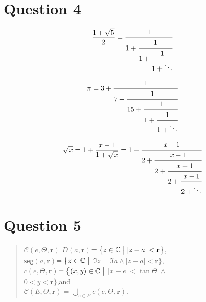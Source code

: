 \documentclass[a4paper,12pt]{article}
\begin{document}
\section{Question 4}

\[
  \frac{1+\sqrt{5}}{2}=
   \cfrac{1}{1+
	\cfrac{1}{1+
     \cfrac{1}{1+\ddots
}}}
\]

\[
  \pi=3+
   \cfrac{1}{7+
	\cfrac{1}{15+
	 \cfrac{1}{1+
	  \cfrac{1}{1+\ddots
}}}}
\]

\[
  \sqrt{x} =1 + \frac{x-1}{1+\sqrt{x}}=1+
   \cfrac{x-1}{2+
	\cfrac{x-1}{2+
	 \cfrac{x-1}{2+
	  \cfrac{x-1}{2+\ddots
}}}}
\]

\section{Question 5}

\begin{quote}
  \begin{tabbing}
	$\mathcal{C}(e,\Theta,\mathbf{r})$\quad\=\kill
	  $D(a,\mathbf{r})$\>$=\bigl\{ z\in \mathbb{C}\bigm| |z-a| 
	  < \mathbf{r}\big\}$,\\
	  $\mathsf{seg} (a,\textbf{r})$\>$=\bigl\{z\in\mathbb{C}\bigm|$ \=$\Im
	  z=\Im a \land |z-a|<\mathbf{r}\bigr\}$,\\
	  $c(e,\Theta,\mathbf{r})$\>$=\bigl\{(x,y)\in \mathbb{C}\bigm|$ \=$|x-e|
	  <\tan\Theta\:\land$\\
	  \>\> $0<y<\mathbf{r}\bigr\}$,and\\
	  $\mathcal{C}(E,\Theta,\mathbf{r})$\>$=\displaystyle\bigcup_{e\in E} c(e, \Theta,\mathbf{r})$.
	\end{tabbing}
\end{quote}
\end{document}
